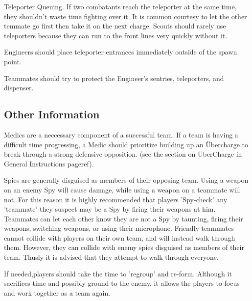 Teleporter Queuing.  If two combatants reach the teleporter at the same time, they shouldn't waste time fighting over it. It is common courtesy to let the other temmate go first then take it on the next charge. Scouts should rarely use teleporters because they can run to the front lines very quickly without it.

Engineers should place teleporter entrances immediately outside of the spawn point. 

Teammates should try to protect the Engineer's sentries, teleporters, and dispenser.

\subsection{Other Information}
Medics are a neccessary component of a successful team. If a team is having a difficult time progressing, a Medic should prioritize building up an Übercharge to break through a strong defensive opposition. (see the section on ÜberCharge in General Instructions {{pageref}}).

Spies are generally disguised as members of their opposing team. Using a weapon on an enemy Spy will cause damage, while using a weapon on a teammate will not. For this reason it is highly recommended that players 'Spy-check' any 'teammate' they suspect may be a Spy by firing their weapons at him. Teammates can let each other know they are not a Spy by taunting, firing their weapons, switching weapons, or using their microphone. Friendly teammates cannot collide with players on their own team, and will instead walk through them. However, they can collide with enemy spies disguised as members of their team. Thusly it is advised that they attempt to walk through everyone.

If needed,players should take the time to 'regroup' and re-form. Although it sacrifices time and possibly ground to the enemy, it allows the players to focus and work together as a team again.